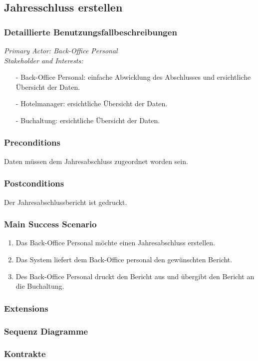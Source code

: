 \documentclass[./detailed_overview_usecases.tex]{subfiles}
\begin{document}
    \subsection{Jahresschluss erstellen}
    \subsubsection{Detaillierte Benutzungsfallbeschreibungen}
    \textit{Primary Actor: Back-Office Personal}
    \\
    \textit{Stakeholder and Interests:}
    \begin{itemize}
        \item[-] Back-Office Personal: einfache Abwicklung des Abschlusses und ersichtliche Übersicht der Daten.
        \item[-] Hotelmanager: ersichtliche Übersicht der Daten.
        \item[-] Buchaltung: ersichtliche Übersicht der Daten.
    \end{itemize}

    \subsubsection*{Preconditions}
    Daten müssen dem Jahresabschluss zugeordnet worden sein.
    \subsubsection*{Postconditions}
    Der Jahresabschlussbericht ist gedruckt.

    \subsubsection*{Main Success Scenario}
    \begin{enumerate}
        \item Das Back-Office Personal möchte einen Jahresabschluss erstellen.
        \item Das System liefert dem Back-Office personal den gewünschten Bericht.
        \item Des Back-Office Personal druckt den Bericht aus und übergibt den Bericht an die Buchaltung.
    \end{enumerate}

    \subsubsection*{Extensions}

    \subsubsection{Sequenz Diagramme}
    \subsubsection{Kontrakte}
\end{document}
